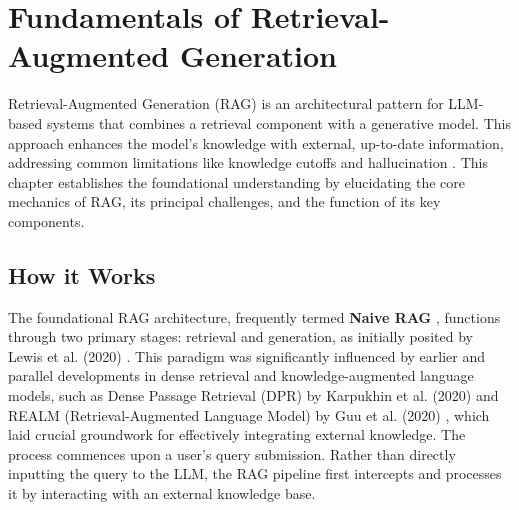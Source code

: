 \chapter{Fundamentals of Retrieval-Augmented Generation}
\label{chap:fundamentals_rag}

Retrieval-Augmented Generation (RAG) is an architectural pattern for LLM-based systems that combines a retrieval component with a generative model. This approach enhances the model's knowledge with external, up-to-date information, addressing common limitations like knowledge cutoffs and hallucination \autocite{lewis2020retrieval, gao2024retrievalaugmented}. This chapter establishes the foundational understanding by elucidating the core mechanics of RAG, its principal challenges, and the function of its key components.

\section{How it Works}
The foundational RAG architecture, frequently termed \textbf{Naive RAG} \autocite{gao2024retrievalaugmented}, functions through two primary stages: retrieval and generation, as initially posited by Lewis et al. (2020) \autocite{lewis2020retrieval}. This paradigm was significantly influenced by earlier and parallel developments in dense retrieval and knowledge-augmented language models, such as Dense Passage Retrieval (DPR) by Karpukhin et al. (2020) \autocite{karpukhin2020dense} and REALM (Retrieval-Augmented Language Model) by Guu et al. (2020) \autocite{guu2020realm}, which laid crucial groundwork for effectively integrating external knowledge. The process commences upon a user's query submission. Rather than directly inputting the query to the LLM, the RAG pipeline first intercepts and processes it by interacting with an external knowledge base.


